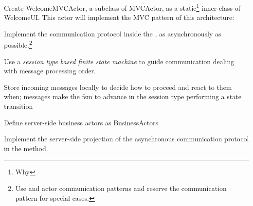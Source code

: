\begin{feature}
\begin{task}
  Create WelcomeMVCActor, a subclass of MVCActor, as a
  static\footnote{Why } inner class of WelcomeUI. This
  actor will implement the MVC pattern of this architecture:
  \begin{task}
    Implement the communication protocol inside the
    , as asynchronously as possible.\footnote{Use
       and  actor communication patterns and
      reserve the  communication pattern for special cases.}
  \end{task}
  \begin{task}
    Use a \emph{session type based finite state machine} to guide
    communication dealing with message processing order.
  \end{task}
  \begin{task}
    Store incoming messages locally to decide how to proceed and react
    to them when; messages make the fsm to advance in the session type
    performing a state transition
  \end{task}
  \begin{task}
    Define server-side business actors as BusinessActors
  \end{task}
  \begin{task}
    Implement the server-side projection of the asynchronous
    communication protocol in the  method.
  \end{task}
\end{task}
%


\end{feature}




